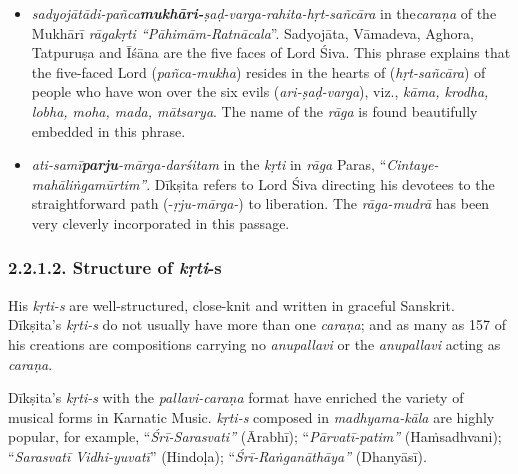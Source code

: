\begin{itemize}
 \item \textit{sadyojātādi-pañca\textbf{mukhāri-}ṣaḍ-varga-rahita-hṛt-sañcāra} in the\break \textit{caraṇa} of the Mukhārī\textit{ rāgakṛti “Pāhimām-Ratnācala}”. Sadyojāta, Vāmadeva, Aghora, Tatpuruṣa and Īśāna are the five faces of Lord Śiva. This phrase explains that the five-faced Lord (\textit{pañca-mukha}) resides in the hearts of (\textit{hṛt-sañcāra}) of people who have won over the six evils (\textit{ari-ṣaḍ-varga}), viz., \textit{kāma, krodha, lobha, moha, mada, mātsarya}. The name of the \textit{rāga} is found beautifully embedded in this phrase.

 \item \textit{ati-samī\textbf{parju}-mārga-darśitam} in the \textit{kṛti} in \textit{rāga} Paras, “\textit{Cintaye-mahāliṅgamūrtim”}. Dīkṣita refers to Lord Śiva directing his devotees to the straightforward path (-\textit{ṛju-mārga-}) to liberation. The \textit{rāga-mudrā} has been very cleverly incorporated in this passage.

\end{itemize}


\subsubsection*{2.2.1.2. Structure of \textit{kṛti}-s}

His \textit{kṛti-s} are well-structured, close-knit and written in graceful Sanskrit. Dīkṣita’s \textit{kṛti-s} do not usually have more than one \textit{caraṇa}; and as many as 157 of his creations are compositions carrying no \textit{anupallavi} or the \textit{anupallavi} acting as \textit{caraṇa}.

Dīkṣita’s \textit{kṛti-s} with the \textit{pallavi-caraṇa} format have enriched the variety of musical forms in Karnatic Music. \textit{kṛti-s} composed in \textit{madhyama-kāla} are highly popular, for example, “\textit{Śrī-Sarasvati”} (Ārabhī); “\textit{Pārvatī-patim”} (Haṁsadhvani); “\textit{Sarasvatī Vidhi-yuvatī}” (Hindoḷa); “\textit{Śrī-Raṅganāthāya”} (Dhanyāsī).

